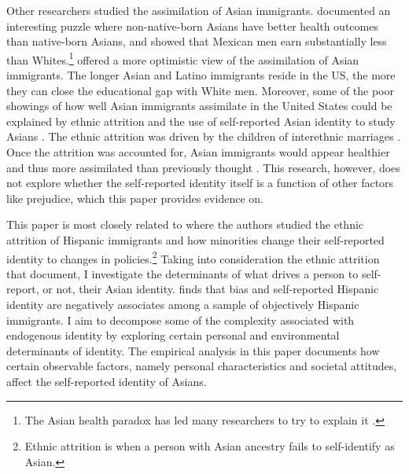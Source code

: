 Other researchers studied the assimilation of Asian immigrants. \textcite{antecolUnhealthyAssimilationWhy2006} documented an interesting puzzle where non-native-born Asians have better health outcomes than native-born Asians, and \textcite{trejoWhyMexicanAmericans1997} showed that Mexican men earn substantially less than Whites.\footnote{The Asian health paradox has led many researchers to try to explain it \autocite{giuntellaAssimilationHealthEvidence2016,giuntellaAccelerationImmigrantUnhealthy2017,giuntellaReasonImmigrationImmigrants2018,giuntellaWhyDoesHealth2017a,antmanEthnicAttritionObserved2016,antmanEthnicAttritionAssimilation2020}.} \textcite{smithAssimilationLatinoGenerations2003} offered a more optimistic view of the assimilation of Asian immigrants. The longer Asian and Latino immigrants reside in the US, the more they can close the educational gap with White men. Moreover, some of the poor showings of how well Asian immigrants assimilate in the United States could be explained by ethnic attrition and the use of self-reported Asian identity to study Asians \autocite{duncanComplexityImmigrantGenerations2017,duncanWhoRemainsMexican2011,mengIntermarriageEconomicAssimilation2005,duncanIdentifyingLaterGenerationDescendants2018,duncanSocioeconomicIntegrationImmigrant2018,antmanEthnicAttritionObserved2016,antmanEthnicAttritionAssimilation2020}. The ethnic attrition was driven by the children of interethnic marriages \autocite{mengIntermarriageEconomicAssimilation2005,duncanEthnicIdentificationIntermarriage2005}. Once the attrition was accounted for, Asian immigrants would appear healthier and thus more assimilated than previously thought \autocite{antmanEthnicAttritionObserved2016,antmanEthnicAttritionAssimilation2020}. This research, however, does not explore whether the self-reported identity itself is a function of other factors like prejudice, which this paper provides evidence on. 

This paper is most closely related to \textcite{hadah2024hispanicidentity, antmanEthnicAttritionObserved2016,antmanIncentivesIdentifyRacial2015,antmanAmericanIndianCasinos2021} where the authors studied the ethnic attrition of Hispanic immigrants and how minorities change their self-reported identity to changes in policies.\footnote{Ethnic attrition is when a person with Asian ancestry fails to self-identify as Asian.} Taking into consideration the ethnic attrition that \textcite{antmanEthnicAttritionObserved2016} document, I investigate the determinants of what drives a person to self-report, or not, their Asian identity. \textcite{hadah2024hispanicidentity} finds that bias and self-reported Hispanic identity are negatively associates among a sample of objectively Hispanic immigrants. I aim to decompose some of the complexity associated with endogenous identity by exploring certain personal and environmental determinants of identity. The empirical analysis in this paper documents how certain observable factors, namely personal characteristics and societal attitudes, affect the self-reported identity of Asians.

